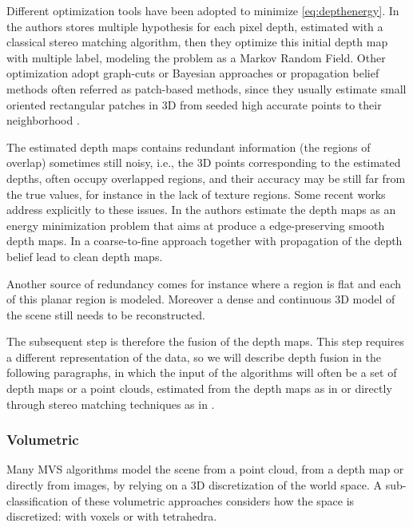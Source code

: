 Different optimization tools have been adopted to minimize \eqref{eq:depthenergy}. In \cite{campbell2008using} the authors stores multiple hypothesis for each pixel depth, estimated with a classical stereo matching algorithm, then they optimize this initial depth map with multiple label, modeling the problem as a Markov Random Field. Other optimization adopt graph-cuts \cite{kolmogorov2002multi} or Bayesian approaches \cite{strecha2006combined,gargallo2005bayesian} or propagation belief methods often referred as patch-based methods, since they usually estimate small oriented rectangular patches in 3D from seeded high accurate points to their neighborhood \cite{fu10,goesele2007multi,Tola12,bleyer2011patchmatch,heise2013pm}.




The estimated depth maps contains redundant information (the regions of overlap) sometimes still noisy, i.e., the 3D points corresponding to the estimated depths, often occupy overlapped regions, and their accuracy may be still far from the true values, for instance in the lack of texture regions.
Some recent works address explicitly to these issues. 
In \cite{semerjian2014new} the authors estimate the depth maps as an energy minimization problem that aims at produce a edge-preserving smooth depth maps.
In \cite{wei2014multi} a coarse-to-fine approach together with propagation of the depth belief lead to clean depth maps.

Another source of redundancy comes for instance where a region is flat and each of this planar region is modeled. Moreover a dense and continuous 3D model of the scene still needs to be reconstructed.

The subsequent step is therefore the fusion of the depth maps. This step requires a different representation of the data, so we will describe depth fusion in the following paragraphs, in which the input of the algorithms will often be a set of depth maps or a point clouds, estimated from the depth maps  as in \cite{curless1996volumetric} or directly through stereo matching techniques as in \cite{bradley2008accurate,labatut2007efficient,vu_et_al_2012}.


\subsubsection{Volumetric}
Many MVS algorithms model the scene from a point cloud, from a depth map or directly from images, by relying on a 3D discretization of the world space.
A sub-classification of these volumetric approaches considers how the space is discretized: with voxels or with tetrahedra.


